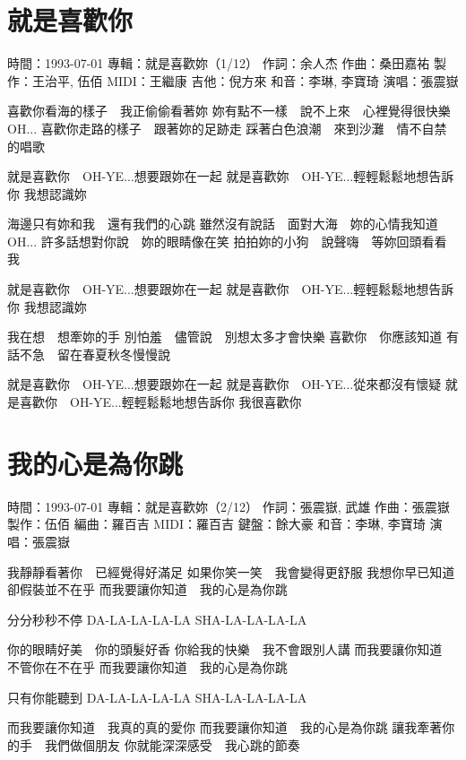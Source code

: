 \documentclass[UTF8,a4paper,oneside,twocolumn,12pt]{ctexbook}
\newcommand{\infopair}[2]{\textbullet #1：#2}
\newcommand{\zc}[1][伍佰]{\infopair{作詞}{#1}}
\newcommand{\zq}[1][伍佰]{\infopair{作曲}{#1}}
\newcommand{\bq}[1][伍佰]{\infopair{編曲}{#1}}
\newcommand{\zj}[1]{\infopair{專輯}{#1}}
\newcommand{\zz}[1]{\infopair{製作}{#1}}
\newcommand{\sj}[1]{\infopair{時間}{#1}}
\newenvironment{info}{\begin{flushleft}\kaishu
	}
	{\end{flushleft}\normalsize\yahei\par}
\newenvironment{lyric}{
	}
{}
\begin{document}
\section{就是喜歡你}
\begin{info}
	\sj{1993-07-01}
	\zj{就是喜歡妳（1/12）}
	\zc[余人杰]
	\zq[桑田嘉祐]
	\zz{王治平, 伍佰}
	\infopair{MIDI}{王繼康}
	\infopair{吉他}{倪方來}
	\infopair{和音}{李琳, 李寶琦}
	\infopair{演唱}{張震嶽}
\end{info}
\begin{lyric}
	喜歡你看海的樣子　我正偷偷看著妳
	妳有點不一樣　說不上來　心裡覺得很快樂 OH...
	喜歡你走路的樣子　跟著妳的足跡走
	踩著白色浪潮　來到沙灘　情不自禁的唱歌

	就是喜歡你　OH-YE...想要跟妳在一起
	就是喜歡妳　OH-YE...輕輕鬆鬆地想告訴你
	我想認識妳

	海邊只有妳和我　還有我們的心跳
	雖然沒有說話　面對大海　妳的心情我知道　OH...
	許多話想對你說　妳的眼睛像在笑
	拍拍妳的小狗　說聲嗨　等妳回頭看看我

	就是喜歡你　OH-YE...想要跟妳在一起
	就是喜歡你　OH-YE...輕輕鬆鬆地想告訴你
	我想認識妳

	我在想　想牽妳的手
	別怕羞　儘管說　別想太多才會快樂
	喜歡你　你應該知道
	有話不急　留在春夏秋冬慢慢說

	就是喜歡你　OH-YE...想要跟妳在一起
	就是喜歡你　OH-YE...從來都沒有懷疑
	就是喜歡你　OH-YE...輕輕鬆鬆地想告訴你
	我很喜歡你
\end{lyric}

\section{我的心是為你跳}
\begin{info}
	\sj{1993-07-01}
	\zj{就是喜歡妳（2/12）}
	\zc[張震嶽, 武雄]
	\zq[張震嶽]
	\zz{伍佰}
	\bq[羅百吉]
	\infopair{MIDI}{羅百吉}
	\infopair{鍵盤}{餘大豪}
	\infopair{和音}{李琳, 李寶琦}
	\infopair{演唱}{張震嶽}
\end{info}
\begin{lyric}
	我靜靜看著你　已經覺得好滿足
	如果你笑一笑　我會變得更舒服
	我想你早已知道　卻假裝並不在乎
	而我要讓你知道　我的心是為你跳

	分分秒秒不停 DA-LA-LA-LA-LA SHA-LA-LA-LA-LA

	你的眼睛好美　你的頭髮好香
	你給我的快樂　我不會跟別人講
	而我要讓你知道　不管你在不在乎
	而我要讓你知道　我的心是為你跳

	只有你能聽到 DA-LA-LA-LA-LA SHA-LA-LA-LA-LA

	而我要讓你知道　我真的真的愛你
	而我要讓你知道　我的心是為你跳
	讓我牽著你的手　我們做個朋友
	你就能深深感受　我心跳的節奏
\end{lyric}
\end{document}
